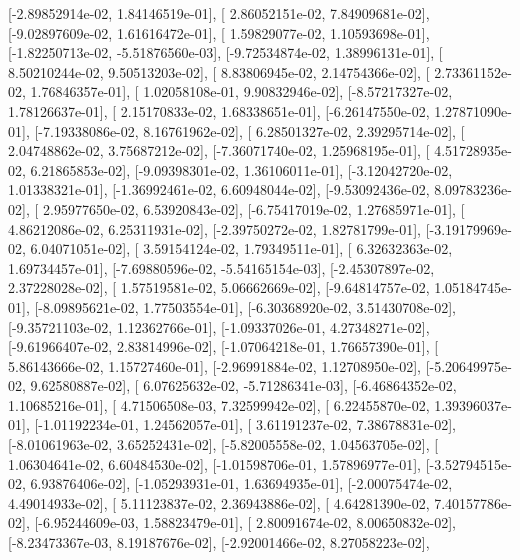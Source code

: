 \documentclass{article}
\begin{document}
       [-2.89852914e-02,  1.84146519e-01],
       [ 2.86052151e-02,  7.84909681e-02],
       [-9.02897609e-02,  1.61616472e-01],
       [ 1.59829077e-02,  1.10593698e-01],
       [-1.82250713e-02, -5.51876560e-03],
       [-9.72534874e-02,  1.38996131e-01],
       [ 8.50210244e-02,  9.50513203e-02],
       [ 8.83806945e-02,  2.14754366e-02],
       [ 2.73361152e-02,  1.76846357e-01],
       [ 1.02058108e-01,  9.90832946e-02],
       [-8.57217327e-02,  1.78126637e-01],
       [ 2.15170833e-02,  1.68338651e-01],
       [-6.26147550e-02,  1.27871090e-01],
       [-7.19338086e-02,  8.16761962e-02],
       [ 6.28501327e-02,  2.39295714e-02],
       [ 2.04748862e-02,  3.75687212e-02],
       [-7.36071740e-02,  1.25968195e-01],
       [ 4.51728935e-02,  6.21865853e-02],
       [-9.09398301e-02,  1.36106011e-01],
       [-3.12042720e-02,  1.01338321e-01],
       [-1.36992461e-02,  6.60948044e-02],
       [-9.53092436e-02,  8.09783236e-02],
       [ 2.95977650e-02,  6.53920843e-02],
       [-6.75417019e-02,  1.27685971e-01],
       [ 4.86212086e-02,  6.25311931e-02],
       [-2.39750272e-02,  1.82781799e-01],
       [-3.19179969e-02,  6.04071051e-02],
       [ 3.59154124e-02,  1.79349511e-01],
       [ 6.32632363e-02,  1.69734457e-01],
       [-7.69880596e-02, -5.54165154e-03],
       [-2.45307897e-02,  2.37228028e-02],
       [ 1.57519581e-02,  5.06662669e-02],
       [-9.64814757e-02,  1.05184745e-01],
       [-8.09895621e-02,  1.77503554e-01],
       [-6.30368920e-02,  3.51430708e-02],
       [-9.35721103e-02,  1.12362766e-01],
       [-1.09337026e-01,  4.27348271e-02],
       [-9.61966407e-02,  2.83814996e-02],
       [-1.07064218e-01,  1.76657390e-01],
       [ 5.86143666e-02,  1.15727460e-01],
       [-2.96991884e-02,  1.12708950e-02],
       [-5.20649975e-02,  9.62580887e-02],
       [ 6.07625632e-02, -5.71286341e-03],
       [-6.46864352e-02,  1.10685216e-01],
       [ 4.71506508e-03,  7.32599942e-02],
       [ 6.22455870e-02,  1.39396037e-01],
       [-1.01192234e-01,  1.24562057e-01],
       [ 3.61191237e-02,  7.38678831e-02],
       [-8.01061963e-02,  3.65252431e-02],
       [-5.82005558e-02,  1.04563705e-02],
       [ 1.06304641e-02,  6.60484530e-02],
       [-1.01598706e-01,  1.57896977e-01],
       [-3.52794515e-02,  6.93876406e-02],
       [-1.05293931e-01,  1.63694935e-01],
       [-2.00075474e-02,  4.49014933e-02],
       [ 5.11123837e-02,  2.36943886e-02],
       [ 4.64281390e-02,  7.40157786e-02],
       [-6.95244609e-03,  1.58823479e-01],
       [ 2.80091674e-02,  8.00650832e-02],
       [-8.23473367e-03,  8.19187676e-02],
       [-2.92001466e-02,  8.27058223e-02],
\end{document}
